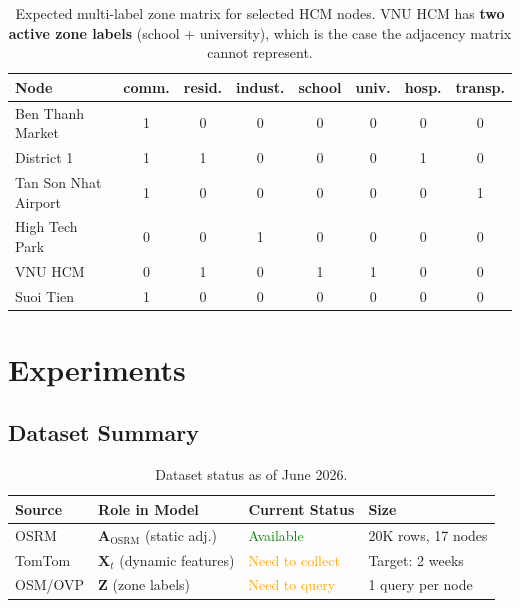 \documentclass[12pt,a4paper]{article}
\begin{document}
\begin{table}[h]
\centering
\small
\begin{tabular}{lccccccc}
\toprule
\textbf{Node} & \textbf{comm.} & \textbf{resid.} & \textbf{indust.} & \textbf{school} & \textbf{univ.} & \textbf{hosp.} & \textbf{transp.} \\
\midrule
Ben Thanh Market    & 1 & 0 & 0 & 0 & 0 & 0 & 0 \\
District 1          & 1 & 1 & 0 & 0 & 0 & 1 & 0 \\
Tan Son Nhat Airport& 1 & 0 & 0 & 0 & 0 & 0 & 1 \\
High Tech Park      & 0 & 0 & 1 & 0 & 0 & 0 & 0 \\
VNU HCM             & 0 & 1 & 0 & 1 & 1 & 0 & 0 \\
Suoi Tien           & 1 & 0 & 0 & 0 & 0 & 0 & 0 \\
\bottomrule
\end{tabular}
\caption{Expected multi-label zone matrix for selected HCM nodes.
         VNU HCM has \textbf{two active zone labels} (school + university),
         which is the case the adjacency matrix cannot represent.}
\end{table}

\section{Experiments}

\subsection{Dataset Summary}

\begin{table}[h]
\centering
\begin{tabular}{llll}
\toprule
\textbf{Source} & \textbf{Role in Model} & \textbf{Current Status} & \textbf{Size} \\
\midrule
OSRM & $\mathbf{A}_{\text{OSRM}}$ (static adj.) & \textcolor{green}{Available} & 20K rows, 17 nodes \\
TomTom & $\mathbf{X}_t$ (dynamic features) & \textcolor{orange}{Need to collect} & Target: 2 weeks \\
OSM/OVP & $\mathbf{Z}$ (zone labels) & \textcolor{orange}{Need to query} & 1 query per node \\
\bottomrule
\end{tabular}
\caption{Dataset status as of June 2026.}
\end{table}
\end{document}
